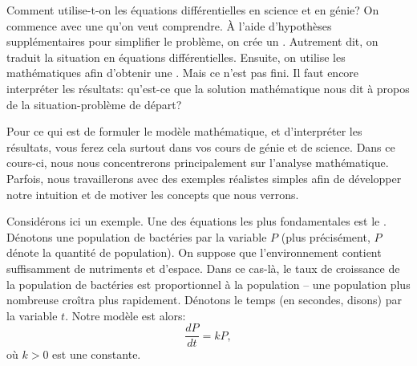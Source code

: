 Comment utilise-t-on les équations différentielles en science et en génie?
On commence avec une \emph{} qu'on veut comprendre.
À l'aide d'hypothèses supplémentaires pour simplifier le problème, on crée un \emph{}.
Autrement dit, on traduit la situation en équations différentielles.
Ensuite, on utilise les mathématiques afin d'obtenir une \emph{}.
Mais ce n'est pas fini.  Il faut encore interpréter les résultats: qu'est-ce que la solution mathématique
nous dit à propos de la situation-problème de départ?

Pour ce qui est de formuler le modèle mathématique, et d'interpréter les résultats, vous ferez cela surtout dans vos cours de génie et de science.
Dans ce cours-ci, nous nous concentrerons principalement sur l'analyse mathématique.
Parfois, nous travaillerons avec des exemples réalistes simples afin de développer notre intuition et de motiver les concepts que nous verrons.

Considérons ici un exemple.  Une des équations les plus fondamentales est le \emph{}.
Dénotons une population de bactéries par la variable $P$ (plus précisément, $P$ dénote la quantité de population).
On suppose que l'environnement contient suffisamment de nutriments et d'espace.
Dans ce cas-là, le taux de croissance de la population de bactéries est proportionnel à la population --
une population plus nombreuse croîtra plus rapidement.
Dénotons le temps (en secondes, disons) par la variable $t$.
Notre modèle est alors:
\begin{equation*}
	\frac{dP}{dt} = kP,
\end{equation*}
où $k > 0$ est une constante.

